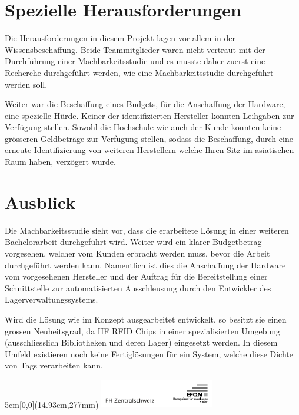 \documentclass[
	a4paper
]{scrartcl}
\begin{document}
\section{Spezielle Herausforderungen}
Die Herausforderungen in diesem Projekt lagen vor allem in der Wissensbeschaffung. Beide Teammitglieder waren nicht vertraut mit der Durchführung einer Machbarkeitsstudie und es musste daher zuerst eine Recherche durchgeführt werden, wie eine Machbarkeitsstudie durchgeführt werden soll.

Weiter war die Beschaffung eines Budgets, für die Anschaffung der Hardware, eine spezielle Hürde. Keiner der identifizierten Hersteller konnten Leihgaben zur Verfügung stellen. Sowohl die Hochschule wie auch der Kunde konnten keine grösseren Geldbeträge zur Verfügung stellen, sodass die Beschaffung, durch eine erneute Identifizierung von weiteren Herstellern welche Ihren Sitz im asiatischen Raum haben, verzögert wurde.

\section{Ausblick}
Die Machbarkeitsstudie sieht vor, dass die erarbeitete Lösung in einer weiteren Bachelorarbeit durchgeführt wird. Weiter wird ein klarer Budgetbetrag vorgesehen, welcher vom Kunden erbracht werden muss, bevor die Arbeit durchgeführt werden kann. Namentlich ist dies die Anschaffung der Hardware vom vorgesehenen Hersteller und der Auftrag für die Bereitstellung einer Schnittstelle zur automatisierten Ausschleusung durch den Entwickler des Lagerverwaltungssystems.

Wird die Lösung wie im Konzept ausgearbeitet entwickelt, so besitzt sie einen grossen Neuheitsgrad, da HF RFID Chips in einer spezialisierten Umgebung (ausschliesslich Bibliotheken und deren Lager) eingesetzt werden. In diesem Umfeld existieren noch keine Fertiglösungen für ein System, welche diese Dichte von Tags verarbeiten kann.

\vspace{0.5em}
\noindent
\begin{textblock*}{5cm}[0,0](14.93cm,277mm)
	\includegraphics[keepaspectratio,width=5cm]{img/FHZ_Logo}
\end{textblock*}
\end{document}
